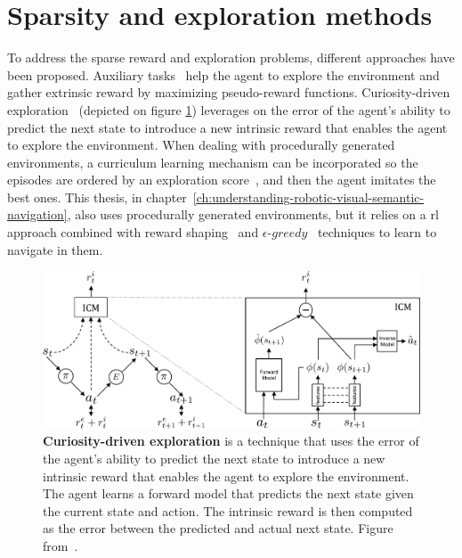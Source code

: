 \section{Sparsity and exploration methods}\label{sec:sparsity-and-exploration-methods}
To address the sparse reward and exploration problems, different approaches have been proposed.
Auxiliary tasks~\cite{jaderberg2016, ye2021} help the agent to explore the environment and gather extrinsic reward by maximizing pseudo-reward functions.
Curiosity-driven exploration~\cite{pathak2017} (depicted on figure \ref{fig:curiosity}) leverages on the error of the agent's ability to predict the next state to introduce a new intrinsic reward that enables the agent to explore the environment.
When dealing with procedurally generated environments, a curriculum learning mechanism can be incorporated so the episodes are ordered by an exploration score~\cite{zha2020b}, and then the agent imitates the best ones.
This thesis, in chapter~\ref{ch:understanding-robotic-visual-semantic-navigation}, also uses procedurally generated environments, but it relies on a \acrshort{rl} approach combined with reward shaping~\cite{ng1999, jestel2021} and $\epsilon\text{-}greedy$~\cite{mnih2013} techniques to learn to navigate in them.

\begin{figure}
    \centering
    \includegraphics[width=\textwidth]{figures/related_work/curiosity}
    \caption{\textbf{Curiosity-driven exploration} is a technique that uses the error of the agent's ability to predict the next state to introduce a new intrinsic reward that enables the agent to explore the environment.
    The agent learns a forward model that predicts the next state given the current state and action.
    The intrinsic reward is then computed as the error between the predicted and actual next state.
    Figure from~\cite{pathak2017}.}
    \label{fig:curiosity}
\end{figure}

